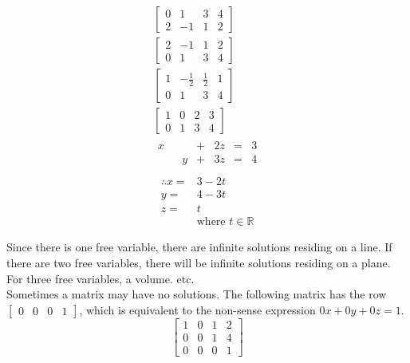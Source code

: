 \documentclass{article}
\theoremstyle{mytheoremstyle}
\theoremstyle{mytheoremstyle}
\theoremstyle{myproblemstyle}
\begin{document}
    \begin{align*}
        \begin{bmatrix}
            0 & 1 & 3 & 4 \\
            2 &-1 & 1 & 2
        \end{bmatrix} \\
        \begin{bmatrix}
            2 &-1 & 1 & 2 \\
            0 & 1 & 3 & 4
        \end{bmatrix} \\
        \begin{bmatrix}
            1 &- \frac{1}{2} & \frac{1}{2} & 1 \\
            0 & 1 & 3 & 4
        \end{bmatrix} \\
        \begin{bmatrix}
            1 & 0 & 2 & 3 \\
            0 & 1 & 3 & 4
        \end{bmatrix} \\
        \begin{matrix}
            x && &+& 2z&=&3 \\
              &&y&+& 3z&=&4
        \end{matrix} \\
    \end{align*}
    \begin{align*}
        \therefore x =& 3-2t \\
                   y =& 4-3t \\
                   z =& t \\
                      &\text{where } t \in \mathbb{R}
    \end{align*}

    Since there is one free variable, there are infinite solutions residing on a
    line. If there are two free variables, there will be infinite solutions
    residing on a plane. For three free variables, a volume. etc. \\
    Sometimes a matrix may have no solutions. The following matrix has the row
    $\begin{bmatrix} 0 & 0 & 0 & 1 \end{bmatrix}$, which is equivalent to the
    non-sense expression $0x+0y+0z=1$. 
    \begin{equation*}
        \begin{bmatrix}
            1 & 0 & 1 & 2 \\
            0 & 0 & 1 & 4 \\
            0 & 0 & 0 & 1
        \end{bmatrix}
    \end{equation*}
\end{document}

